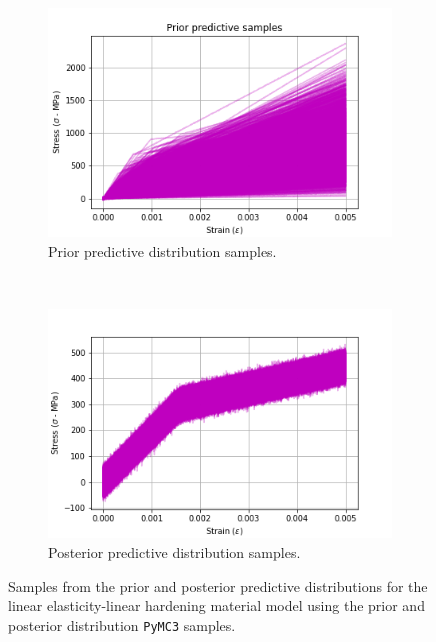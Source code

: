 \documentclass{article}
\begin{document}
	\begin{figure}[htb!]
	\centering
	\begin{subfigure}[b]{0.45\textwidth}
		\centering
		\includegraphics[width=\textwidth]{Q3a_5.png}
		\caption{Prior predictive distribution samples.}
	\end{subfigure}
	~
	\begin{subfigure}[b]{0.45\textwidth}
		\centering
		\includegraphics[width=\textwidth]{Q3a_10.png}
		\caption{Posterior predictive distribution samples.}
	\end{subfigure}
	
	\caption{Samples from the prior and posterior predictive distributions for the linear elasticity-linear hardening material model using the prior and posterior distribution \texttt{PyMC3} samples.}
	\label{fig:Q3_pymc3_prior_post_predictive_samples}
	\end{figure}
\end{document}
